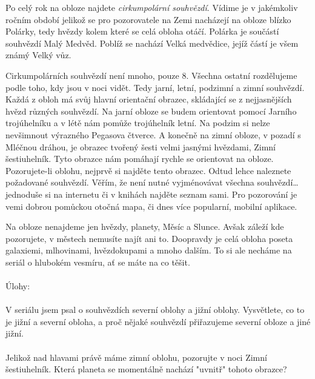 \documentclass[crop=false]{standalone}
\begin{document}
Po celý rok na obloze najdete \textit{cirkumpolární souhvězdí}. 
Vídime je v jakémkoliv ročním období jelikož se pro pozorovatele na Zemi nacházejí na obloze blízko Polárky, tedy hvězdy kolem které se celá obloha otáčí.
Polárka je součástí souhvězdí Malý Medvěd.
Poblíž se nachází Velká medvědice, jejíž částí je všem známý Velký vůz.

Cirkumpolárních souhvězdí není mnoho, pouze 8. Všechna ostatní rozdělujeme podle toho, kdy jsou v noci vidět.
Tedy jarní, letní, podzimní a zimní souhvězdí.
Každá z obloh má svůj hlavní orientační obrazec, skládající se z nejjasnějších hvězd různých souhvězdí.
Na jarní obloze se budem orientovat pomocí Jarního trojúhelníku a v létě nám pomůže trojúhelník letní.
Na podzim si nelze nevšimnout výrazného Pegasova čtverce.
A konečně na zimní obloze, v pozadí s Mléčnou dráhou, je obrazec tvořený šesti velmi jasnými hvězdami, Zimní šestiuhelník.
Tyto obrazce nám pomáhají rychle se orientovat na obloze.
Pozorujete-li oblohu, nejprvě si najděte tento obrazec. Odtud lehce naleznete požadované souhvězdí.
Věřím, že není nutné vyjménovávat všechna souhvězdí\dots jednoduše si na internetu či v knihách najděte seznam sami.
Pro pozorování je vemi dobrou pomůckou otočná mapa, či dnes více popularní, mobilní aplikace.

Na obloze nenajdeme jen hvězdy, planety, Měsíc a Slunce. Avšak záleží kde pozorujete, v městech nemusíte najít ani to.
Doopravdy je celá obloha poseta galaxiemi, mlhovinami, hvězdokupami a mnoho dalším. 
To si ale necháme na seriál o hlubokém vesmíru, ať se máte na co těšit.
\\
\\
Úlohy: %
\\
\\
V seriálu jsem psal o souhvězdích severní oblohy a jižní oblohy.
Vysvětlete, co to je jižní a severní obloha, a proč nějaké souhvězdí přiřazujeme severní obloze a jiné jižní.
\\
\\
Jelikož nad hlavami právě máme zimní oblohu, pozorujte v noci Zimní šestiuhelník.
Která planeta se momentálně nachází "uvnitř" tohoto obrazce?
\end{document}
